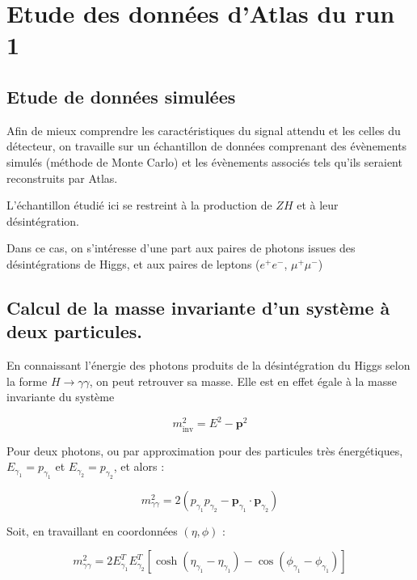 \documentclass[11pt]{article} %
\begin{document}
\section{Etude des données d'Atlas du run 1}

\subsection{Etude de données simulées}

Afin de mieux comprendre les caractéristiques du signal attendu et les celles du détecteur, on travaille sur un échantillon de données comprenant des évènements simulés (méthode de Monte Carlo) et les évènements associés tels qu'ils seraient reconstruits par Atlas.

L'échantillon étudié ici se restreint à la production de $ZH$ et à leur désintégration.

Dans ce cas, on s'intéresse d'une part aux paires de photons issues des désintégrations de Higgs, et aux paires de leptons ($e^+e^-$, $\mu^+\mu^-$)


\subsection{Calcul de la masse invariante d'un système à deux particules.}

En connaissant l'énergie des photons produits de la désintégration du Higgs selon la forme $H\to \gamma \gamma$, on peut retrouver sa masse. Elle est en effet égale à la masse invariante du système 

\begin{equation}
m_{\textrm{inv}}^2 = E^2 - \textbf{p}^2
\end{equation}

Pour deux photons,  ou par approximation pour des particules très énergétiques, $E_{\gamma_1} = p_{\gamma_1}$ et $E_{\gamma_2} = p_{\gamma_2}$, et alors :

\begin{equation}
m_{\gamma \gamma}^2 = 2 \left ( p_{\gamma_1} p_{\gamma_2} - \textbf{p}_{\gamma_1} \cdot \textbf{p}_{\gamma_2} \right )
\end{equation}

Soit, en travaillant en coordonnées $(\eta, \phi)$ :

\begin{equation}
m_{\gamma \gamma}^2 = 2 E_{\gamma_1}^T E_{\gamma_2}^T \left [ \cosh {\left( \eta_{\gamma_1} - \eta_{\gamma_1} \right)} - \cos{\left( \phi_{\gamma_1} - \phi_{\gamma_1} \right)} \right ]
\end{equation}
\end{document}

